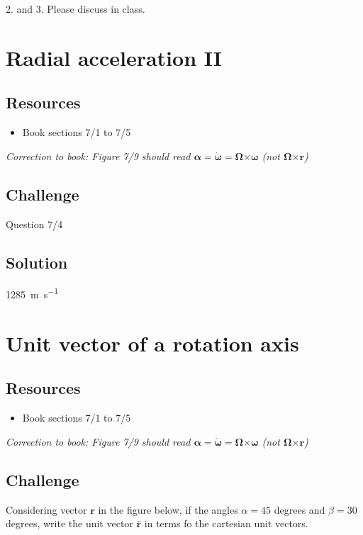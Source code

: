 2. and 3. Please discuss in class.




\newpage
\section{Radial acceleration II}

\subsection*{Resources}
\begin{itemize}
    \item Book sections 7/1 to 7/5
\end{itemize}

\emph{Correction to book: Figure 7/9 should read $\bm{\alpha} = \bm{\dot{\omega}} = \bm{\Omega} \bm{\times} \bm{\omega}$ (not $\bm{\Omega} \bm{\times} \bm{r}$)}

\subsection*{Challenge}
Question 7/4

\subsection*{Solution}
\SI{1285}{\meter\per\second}




\newpage
\section{Unit vector of a rotation axis}

\subsection*{Resources}
\begin{itemize}
    \item Book sections 7/1 to 7/5
\end{itemize}

\emph{Correction to book: Figure 7/9 should read $\bm{\alpha} = \bm{\dot{\omega}} = \bm{\Omega} \bm{\times} \bm{\omega}$ (not $\bm{\Omega} \bm{\times} \bm{r}$)}

\subsection*{Challenge}
Considering vector $\bm{r}$ in the figure below, if the angles $\alpha = 45$ degrees and $\beta = 30$ degrees, write the unit vector $\bm{\hat{r}}$ in terms fo the cartesian unit vectors.

